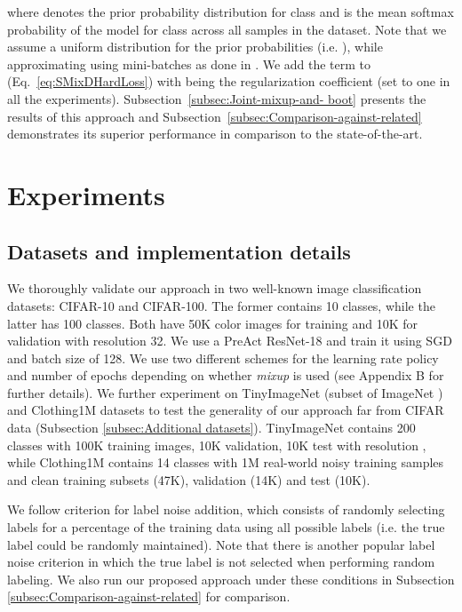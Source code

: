 \documentclass{article}
\begin{document}
where  denotes the prior probability distribution for class
 and  is the mean softmax probability of the
model for class  across all samples in the dataset. Note that
we assume a uniform distribution for the prior probabilities (i.e.
), while approximating  using mini-batches
as done in \cite{2018_CVPR_JointOpt}. We add the term  to  (Eq.~\eqref{eq:SMixDHardLoss}) with  being the regularization coefficient (set to one in all the experiments). Subsection~\ref{subsec:Joint-mixup-and- boot} presents the results of this
approach and Subsection~\ref{subsec:Comparison-against-related} demonstrates its superior performance in comparison to the state-of-the-art.

\section{Experiments}


\subsection{Datasets and implementation details\label{subsec:Datasets-and-implementation}}



We thoroughly validate our approach in two well-known image classification datasets:
CIFAR-10 and CIFAR-100. The former contains 10 classes, while the
latter has 100 classes. Both have 50K color images for training
and 10K for validation with resolution 32. We use a PreAct
ResNet-18 \cite{2016_ECCV_PreActResNet} and train it using SGD and batch size of
128. We use two different schemes for the learning rate policy and number of epochs depending on whether \emph{mixup} is used (see Appendix B for further details). We further experiment on TinyImageNet (subset of ImageNet
\cite{2009_CVPR_ImageNet}) and Clothing1M \cite{2015_CVPR_GraphModelNoise}
 datasets to test the generality of our approach far from CIFAR data
(Subsection \ref{subsec:Additional datasets}). TinyImageNet contains
200 classes with 100K training images, 10K  validation, 
10K test with resolution , while Clothing1M contains
14 classes with 1M real-world noisy training samples and clean training subsets (47K), validation (14K) and test (10K).
 

We follow \cite{2017_ICLR_Rethinking,2018_ICLR_mixup,2018_CVPR_JointOpt}
criterion for label noise addition, which consists of randomly selecting
labels for a percentage of the training data using all possible labels
(i.e. the true label could be randomly maintained). Note that there
is another popular label noise criterion \cite{2018_ICML_MentorNet,2018_CVPR_IterativeNoise}
in which the true label is not selected when performing random labeling.
We also run our proposed approach under these conditions in Subsection
\ref{subsec:Comparison-against-related} for comparison.
\end{document}
